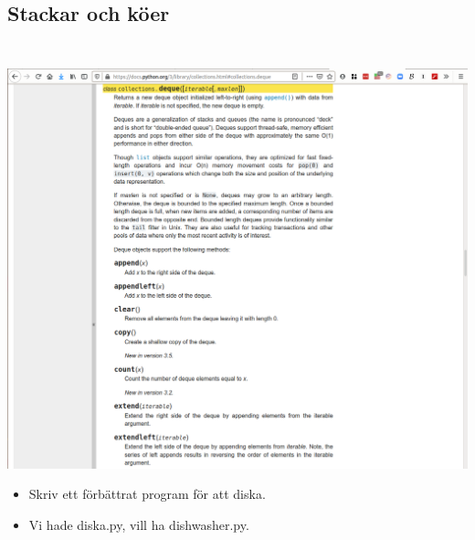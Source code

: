 \subsection{Stackar och köer}

\begin{frame}[fragile]
  \begin{example}[pile.py]
    \inputminted{python}{examples/pile.py}
  \end{example}
\end{frame}

\begin{frame}[fragile]
  \begin{example}[queue.py]
    \inputminted{python}{examples/queue.py}
  \end{example}
\end{frame}

\begin{frame}
  \includegraphics[width=\columnwidth]{figs/docs-deque.png}
\end{frame}

\begin{frame}[fragile]
  \begin{exercise}
    \begin{itemize}
      \item Skriv ett förbättrat program för att diska.
      \item Vi hade diska.py, vill ha dishwasher.py.
    \end{itemize}
  \end{exercise}
\end{frame}


